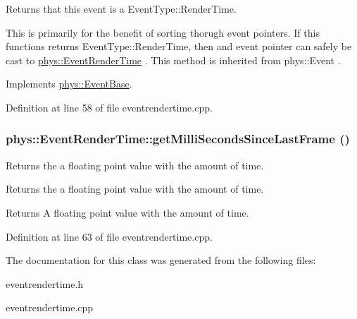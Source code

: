 Returns that this event is a EventType::RenderTime. 

This is primarily for the benefit of sorting thorugh event pointers. If this functions returns EventType::RenderTime, then and event pointer can safely be cast to \hyperlink{classphys_1_1EventRenderTime}{phys::EventRenderTime} . This method is inherited from phys::Event . 

Implements \hyperlink{classphys_1_1EventBase_a0f39a25f4b64f7cf701e174454616366}{phys::EventBase}.



Definition at line 58 of file eventrendertime.cpp.

\hypertarget{classphys_1_1EventRenderTime_ac9f20f13bf1f6e542151be2ce8ea2fa4}{
\subsubsection[{getMilliSecondsSinceLastFrame}]{ phys::EventRenderTime::getMilliSecondsSinceLastFrame ()}}
\label{d3/d8b/classphys_1_1EventRenderTime_ac9f20f13bf1f6e542151be2ce8ea2fa4}


Returns the a floating point value with the amount of time. 

Returns the a floating point value with the amount of time. \begin{DoxyReturn}{Returns}
A floating point value with the amount of time. 
\end{DoxyReturn}


Definition at line 63 of file eventrendertime.cpp.



The documentation for this class was generated from the following files:\begin{DoxyCompactItemize}
\item 
eventrendertime.h\item 
eventrendertime.cpp\end{DoxyCompactItemize}
